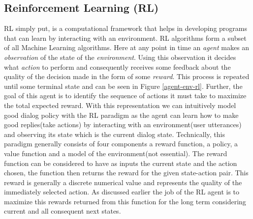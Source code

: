 \documentclass[14pt]{extarticle}
\numberwithin{equation}{section}
\begin{document}
	\subsection{Reinforcement Learning (RL)}
	RL simply put, is a computational framework that helps in developing programs that can learn by interacting with an environment. RL algorithms form a subset of all Machine Learning algorithms. Here at any point in time an \textit{agent} makes an \textit{observation} of the state of the \textit{environment}. Using this observation it decides what \textit{action} to perform and consequently receives some feedback about the quality of the decision made in the form of some \textit{reward}. This process is repeated until some terminal state and can be seen in Figure \ref{agent-env-rl}. Further, the goal of this agent is to identify the sequence of actions it must take to maximize the total expected reward. With this representation we can intuitively model good dialog policy with the RL paradigm as the agent can learn how to make good replies(take actions) by interacting with an environment(user utterances) and observing its state which is the current dialog state. Technically, this paradigm generally consists of four components a reward function, a policy, a value function and a model of the environment(not essential). The reward function can be considered to have as inputs the current state and the action chosen, the function then returns the reward for the given state-action pair. This reward is generally a discrete numerical value and represents the quality of the immediately selected action. As discussed earlier the job of the RL agent is to maximize this rewards returned from this function for the long term considering current and all consequent next states.
	
\end{document}
